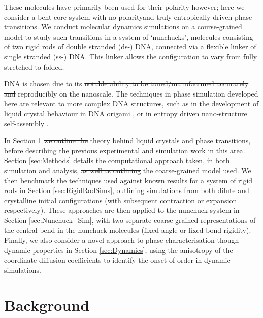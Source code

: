 \documentclass[11pt, a4paper]{article} %
\providecommand{\DIFadd}[1]{{\protect\color{blue}\uwave{#1}}} %
\providecommand{\DIFdel}[1]{{\protect\color{red}\sout{#1}}}                      %
\providecommand{\DIFaddbegin}{} %
\providecommand{\DIFaddend}{} %
\providecommand{\DIFdelbegin}{} %
\providecommand{\DIFdelend}{} %
\begin{document}
These molecules have primarily been used for their polarity however; here we consider a bent-core system with no polarity\DIFdelbegin \DIFdel{and truly }\DIFdelend \DIFaddbegin \DIFadd{, \textcolor{forestgreen}{which displays true} }\DIFaddend entropically driven phase transitions. We conduct molecular dynamics simulations on a course-grained model to study such transitions in a system of ‘nunchucks’, molecules consisting of two rigid rods of double stranded (ds-) DNA, connected via a flexible linker of single stranded (ss-) DNA. This linker allows the configuration to vary from fully stretched to folded. 

DNA is chosen due to its \DIFdelbegin \DIFdel{notable ability to be tuned/manufactured accurately and }\DIFdelend \DIFaddbegin \DIFadd{\textcolor{forestgreen}{availablity through PCR, its exact design in terms of sequence and thus its} }\DIFaddend reproducibly on the nanoscale. The techniques in phase simulation developed here are relevant to more complex DNA structures, such as in the development of liquid crystal behaviour in DNA origami \cite{Cha2015,Wang2018}, or in entropy driven nano-structure self-assembly \cite{Barry2010, Lin2000}.

In Section \ref{sec:Background} \DIFdelbegin \DIFdel{we outline the }\DIFdelend \DIFaddbegin \DIFadd{\textcolor{forestgreen}{I} outline the \textcolor{forestgreen}{thermodynamic} }\DIFaddend theory behind liquid crystals and phase transitions, before describing the previous experimental and simulation work in this area. Section \ref{sec:Methods} details the computational approach taken, in both simulation and analysis, \DIFdelbegin \DIFdel{as well as outlining }\DIFdelend \DIFaddbegin \DIFadd{\textcolor{forestgreen}{and outlines} }\DIFaddend the coarse-grained model used. We then benchmark the techniques used against known results for a system of rigid rods in Section \ref{sec:RigidRodSims}, outlining simulations from both dilute and crystalline initial configurations (with subsequent contraction or expansion respectively). These approaches are then applied to the nunchuck system in Section \ref{sec:Nunchuck_Sim}, with two separate coarse-grained representations of the central bend in the nunchuck molecules (fixed angle or fixed bond rigidity). Finally, we also consider a novel approach to phase characterisation though dynamic properties in Section \ref{sec:Dynamics}, using the anisotropy of the coordinate diffusion coefficients to identify the onset of order in dynamic simulations.


\section{Background} \label{sec:Background}
\end{document}
